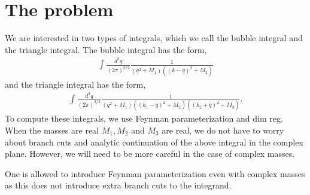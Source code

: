 \documentclass[twoside]{article}
\begin{document}
\section{The problem}
We are interested in two types of integrals, which we call the bubble integral and the triangle integral. The bubble integral has the form,
\begin{align}
  \int \frac{d^3q}{(2\pi)^{3/2}}\frac{1}{(q^2 + M_1)( (k-q)^2 + M_2)}
\end{align}
and the triangle integral has the form,
\begin{align}
  \int \frac{d^3q}{(2\pi)^{3/2}}\frac{1}{(q^2 + M_1)( (k_1-q)^2 + M_2)( (k_2 + q)^2 + M_3)}.
\end{align}
To compute these integrals, we use Feynman parameterization and dim reg. When the masses are real $M_1,M_2$ and $M_3$ are real, we do not
have to worry about branch cuts and analytic continuation of the above integral in the complex plane. However, we will need to be more
careful in the case of complex masses. 

One is allowed to introduce Feynman parameterization even with complex masses as this does not introduce extra branch cuts to the integrand.
\end{document}
